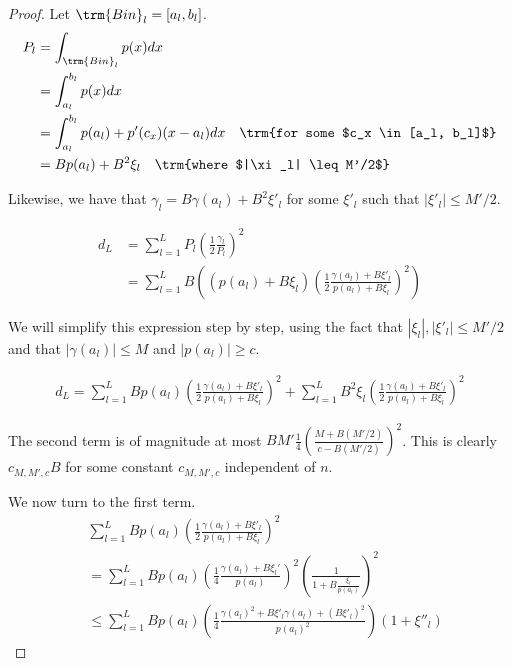 \documentclass{article}
\begin{document}
\begin{proof}

Let $\trm{Bin}_l = [a_l, b_l]$. 
\begin{align*}
P_l &= \int_{\trm{Bin}_l} p(x) dx \\
  &= \int_{a_l}^{b_l} p(x) dx \\
 &= \int_{a_l}^{b_l} p(a_l) + p'(c_x) (x - a_l) dx \quad \trm{for some $c_x \in [a_l, b_l]$}\\
 &= B p(a_l) + B^2 \xi_l \quad \trm{where $|\xi_l| \leq M'/2$}
\end{align*}

Likewise, we have that $\gamma_l = B \gamma(a_l) + B^2 \xi'_l$ for some $\xi'_l$ such that $|\xi'_l | \leq M'/2$. 

\begin{align*}
d_L &= \sum_{l=1}^L P_l \left( \frac{1}{2} \frac{\gamma_l}{P_l} \right)^2 \\
  &= \sum_{l=1}^L B \left(
     (p(a_l) + B \xi_l) \left( \frac{1}{2} \frac{\gamma(a_l) + B \xi'_l}{p(a_l) + B \xi_l} \right)^2 \right) 
\end{align*}

We will simplify this expression step by step, using the fact that $|\xi_l|, |\xi'_l| \leq M'/2$ and that $|\gamma(a_l)| \leq M$ and $|p(a_l)| \geq c$. 

\begin{align*}
d_L = \sum_{l=1}^L B
     p(a_l)  \left( \frac{1}{2} \frac{\gamma(a_l) + B \xi'_l}{p(a_l) + B \xi_l} \right)^2 + \sum_{l=1}^L B^2 \xi_l  \left( \frac{1}{2} \frac{\gamma(a_l) + B \xi'_l}{p(a_l) + B \xi_l} \right)^2 
\end{align*}

The second term is of magnitude at most $B M' \frac{1}{4} \left( \frac{M + B (M'/2)}{c - B (M'/2)} \right)^2$. This is clearly $c_{M, M', c} B$ for some constant $c_{M, M', c}$ independent of $n$. 

We now turn to the first term.
\begin{align*}
& \sum_{l=1}^L B
   p(a_l)  \left( \frac{1}{2} \frac{\gamma(a_l) + B \xi'_l}{p(a_l) + B \xi_l} \right)^2 \\
&= \sum_{l=1}^L B p(a_l) \left( \frac{1}{4} \frac{\gamma(a_l) + B \xi_l'}{p(a_l)} \right)^2
   \left( \frac{1}{ 1 + B \frac{\xi_l}{p(a_l)} } \right)^2 \\
&\leq \sum_{l=1}^L B p(a_l) \left( \frac{1}{4} 
    \frac{ \gamma(a_l)^2 + B \xi'_l \gamma(a_l) + (B \xi'_l)^2}{p(a_l)^2} \right) ( 1 + \xi''_l) 
\end{align*} 


\end{proof}
\end{document}
